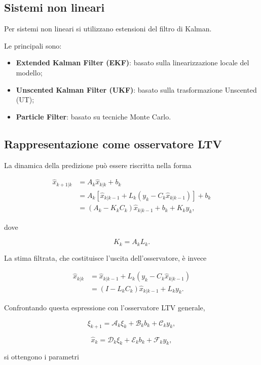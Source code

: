 \documentclass[11pt,a4paper]{article}
\begin{document}
\subsection*{Sistemi non lineari}

Per sistemi non lineari si utilizzano estensioni del filtro di Kalman.

Le principali sono:

\begin{itemize}
    \item \textbf{Extended Kalman Filter (EKF)}: basato sulla linearizzazione locale del modello;
    \item \textbf{Unscented Kalman Filter (UKF)}: basato sulla trasformazione Unscented (UT);
    \item \textbf{Particle Filter}: basato su tecniche Monte Carlo.
\end{itemize}

\subsection*{Rappresentazione come osservatore LTV}

La dinamica della predizione può essere riscritta nella forma

\[
\begin{aligned}
\hat{x}_{k+1|k}
&=
A_k\hat{x}_{k|k}
+b_k
\\
&=
A_k
\left[
\hat{x}_{k|k-1}
+
L_k
\left(
y_k-C_k\hat{x}_{k|k-1}
\right)
\right]
+b_k
\\
&=
(A_k-K_kC_k)\hat{x}_{k|k-1}
+b_k
+
K_ky_k,
\end{aligned}
\]

dove

\[
K_k=A_kL_k.
\]

La stima filtrata, che costituisce l'uscita dell'osservatore, è invece

\[
\begin{aligned}
\hat{x}_{k|k}
&=
\hat{x}_{k|k-1}
+L_k\left(y_k-C_k\hat{x}_{k|k-1}\right)\\
&=
(I-L_kC_k)\hat{x}_{k|k-1}
+L_ky_k.
\end{aligned}
\]

Confrontando questa espressione con l'osservatore LTV generale,

\[
\xi_{k+1}
=
\mathcal{A}_k\xi_k
+
\mathcal{B}_kb_k
+
\mathcal{C}_ky_k,
\]

\[
\hat{x}_k
=
\mathcal{D}_k\xi_k
+
\mathcal{E}_kb_k
+
\mathcal{F}_ky_k,
\]

si ottengono i parametri
\end{document}
